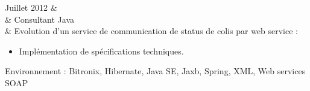 Juillet 2012 	& \\%
				& Consultant Java \\ %
                & Evolution d'un service de communication de status de colis par web service :%
				\begin{itemize}%
    				\item Implémentation de spécifications techniques.%
    			\end{itemize}%
Environnement : Bitronix, Hibernate, Java SE, Jaxb, Spring, XML, Web services SOAP \\\\
